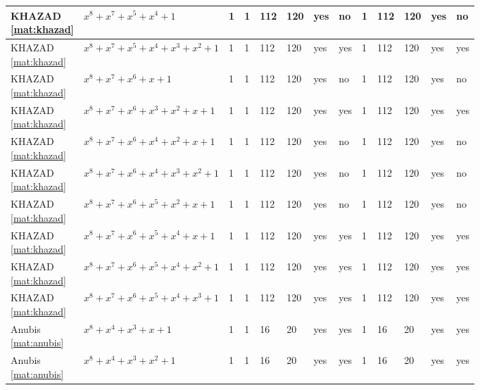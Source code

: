 \begin{tiny}
\begin{longtable}{|l|l|l|l|l|l|l|l|l|l|l|l|l|}
\shortstack{KHAZAD \\ \eqref{mat:khazad}} & $x^8 + x^7 + x^5 + x^4 + 1$ & 1 & 1 & 112 & 120 & yes & no & 1 & 112 & 120 & yes & no \\ \hline
\shortstack{KHAZAD \\ \eqref{mat:khazad}} & $x^8 + x^7 + x^5 + x^4 + x^3 + x^2 + 1$ & 1 & 1 & 112 & 120 & yes & yes & 1 & 112 & 120 & yes & yes \\ \hline
\shortstack{KHAZAD \\ \eqref{mat:khazad}} & $x^8 + x^7 + x^6 + x + 1$ & 1 & 1 & 112 & 120 & yes & no & 1 & 112 & 120 & yes & no \\ \hline
\shortstack{KHAZAD \\ \eqref{mat:khazad}} & $x^8 + x^7 + x^6 + x^3 + x^2 + x + 1$ & 1 & 1 & 112 & 120 & yes & yes & 1 & 112 & 120 & yes & yes \\ \hline
\shortstack{KHAZAD \\ \eqref{mat:khazad}} & $x^8 + x^7 + x^6 + x^4 + x^2 + x + 1$ & 1 & 1 & 112 & 120 & yes & no & 1 & 112 & 120 & yes & no \\ \hline
\shortstack{KHAZAD \\ \eqref{mat:khazad}} & $x^8 + x^7 + x^6 + x^4 + x^3 + x^2 + 1$ & 1 & 1 & 112 & 120 & yes & no & 1 & 112 & 120 & yes & no \\ \hline
\shortstack{KHAZAD \\ \eqref{mat:khazad}} & $x^8 + x^7 + x^6 + x^5 + x^2 + x + 1$ & 1 & 1 & 112 & 120 & yes & no & 1 & 112 & 120 & yes & no \\ \hline
\shortstack{KHAZAD \\ \eqref{mat:khazad}} & $x^8 + x^7 + x^6 + x^5 + x^4 + x + 1$ & 1 & 1 & 112 & 120 & yes & yes & 1 & 112 & 120 & yes & yes \\ \hline
\shortstack{KHAZAD \\ \eqref{mat:khazad}} & $x^8 + x^7 + x^6 + x^5 + x^4 + x^2 + 1$ & 1 & 1 & 112 & 120 & yes & yes & 1 & 112 & 120 & yes & yes \\ \hline
\shortstack{KHAZAD \\ \eqref{mat:khazad}} & $x^8 + x^7 + x^6 + x^5 + x^4 + x^3 + 1$ & 1 & 1 & 112 & 120 & yes & yes & 1 & 112 & 120 & yes & yes \\ \hline
\shortstack{Anubis \\ \eqref{mat:anubis}} & $x^8 + x^4 + x^3 + x + 1$ & 1 & 1 & 16 & 20 & yes & yes & 1 & 16 & 20 & yes & yes \\ \hline
\shortstack{Anubis \\ \eqref{mat:anubis}} & $x^8 + x^4 + x^3 + x^2 + 1$ & 1 & 1 & 16 & 20 & yes & yes & 1 & 16 & 20 & yes & yes \\ \hline

\end{longtable}
\end{tiny}
